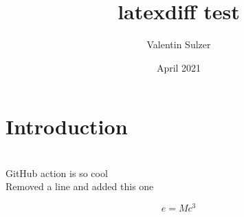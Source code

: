 \documentclass{article}
\title{latexdiff test}
\author{Valentin Sulzer}
\date{April 2021}
\begin{document}
\maketitle

\section{Introduction}


\\GitHub action is so cool
\\Removed a line and added this one

\begin{equation}
    e = Mc^3
\end{equation}
\end{document}
